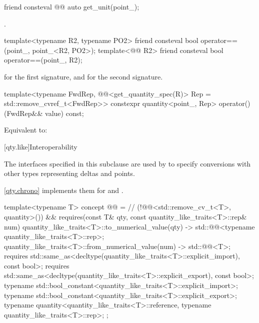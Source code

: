 \begin{itemdecl}
friend consteval @@ auto get_unit(point_);
\end{itemdecl}

\begin{itemdescr}
\pnum
\returns
{}.
\end{itemdescr}

\begin{itemdecl}
template<typename R2, typename PO2>
friend consteval bool operator==(point_, point_<R2, PO2>);
template<@@ R2>
friend consteval bool operator==(point_, R2);
\end{itemdecl}

\begin{itemdescr}
\pnum
\returns
{} for the first signature, and
 for the second signature.
\end{itemdescr}

\begin{itemdecl}
template<typename FwdRep,
         @@<get_quantity_spec(R{})> Rep = std::remove_cvref_t<FwdRep>>
constexpr quantity<point_{}, Rep> operator()(FwdRep&& value) const;
\end{itemdecl}

\begin{itemdescr}
\pnum
\effects
Equivalent to:
\end{itemdescr}

[qty.like]{Interoperability}

\pnum
The interfaces specified in this subclause
are used by 
to specify conversions with other types representing deltas and points.
\begin{note}
\ref{qty.chrono} implements them for  and .
\end{note}

\begin{itemdecl}
template<typename T>
concept @@ =                                       // \expos
  (!@@<std::remove_cv_t<T>, quantity>()) &&
  requires(const T& qty, const quantity_like_traits<T>::rep& num) {
    { quantity_like_traits<T>::to_numerical_value(qty) } ->
      std::@@<typename quantity_like_traits<T>::rep>;
    { quantity_like_traits<T>::from_numerical_value(num) } -> std::@@<T>;
    requires std::same_as<decltype(quantity_like_traits<T>::explicit_import), const bool>;
    requires std::same_as<decltype(quantity_like_traits<T>::explicit_export), const bool>;
    typename std::bool_constant<quantity_like_traits<T>::explicit_import>;
    typename std::bool_constant<quantity_like_traits<T>::explicit_export>;
    typename quantity<quantity_like_traits<T>::reference, typename quantity_like_traits<T>::rep>;
  };
\end{itemdecl}

